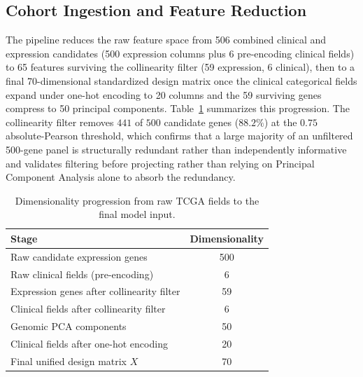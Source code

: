 \documentclass[10pt,a4paper]{article}
\begin{document}
\subsection{Cohort Ingestion and Feature Reduction}
The pipeline reduces the raw feature space from 506 combined clinical and expression candidates (500 expression columns plus 6 pre-encoding clinical fields) to 65 features surviving the collinearity filter (59 expression, 6 clinical), then to a final 70-dimensional standardized design matrix once the clinical categorical fields expand under one-hot encoding to 20 columns and the 59 surviving genes compress to 50 principal components. Table~\ref{tab:dim_progression} summarizes this progression. The collinearity filter removes $441$ of $500$ candidate genes ($88.2\%$) at the $0.75$ absolute-Pearson threshold, which confirms that a large majority of an unfiltered 500-gene panel is structurally redundant rather than independently informative and validates filtering before projecting rather than relying on Principal Component Analysis alone to absorb the redundancy.

\begin{table}[H]
\centering
\caption{Dimensionality progression from raw TCGA fields to the final model input.}
  \label{tab:dim_progression}
  \begin{tabular}{lc}
    \toprule
    Stage & Dimensionality \\
    \midrule
    Raw candidate expression genes & 500 \\
    Raw clinical fields (pre-encoding) & 6 \\
    Expression genes after collinearity filter & 59 \\
    Clinical fields after collinearity filter & 6 \\
    Genomic PCA components & 50 \\
    Clinical fields after one-hot encoding & 20 \\
    Final unified design matrix $X$ & 70 \\
  \bottomrule
\end{tabular}
\end{table}


\end{document}
